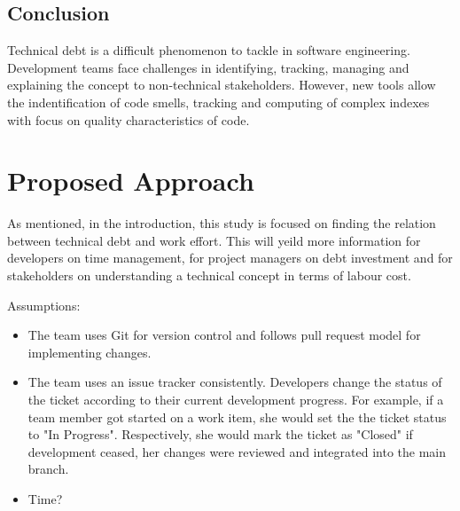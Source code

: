 \documentclass{mprop}
\begin{document}
\subsection{Conclusion}

Technical debt is a difficult phenomenon to tackle in software engineering.
Development teams face challenges in identifying, tracking, managing and
explaining the concept to non-technical stakeholders. However, new tools allow
the indentification of code smells, tracking and computing of complex indexes
with focus on quality characteristics of code.

\section{Proposed Approach}

As mentioned, in the introduction, this study is focused on finding the relation
between technical debt and work effort. This will yeild more information for
developers on time management, for project managers on debt investment and for
stakeholders on understanding a technical concept in terms of labour cost.

Assumptions:
\begin{itemize}
	\item The team uses Git for version control and follows pull request model
	for implementing changes.
	\item The team uses an issue tracker consistently. Developers change the
	status of the ticket according to their current development progress. For
	example, if a team member got started on a work item, she would set the the
	ticket status to "In Progress". Respectively, she would mark the ticket as
	"Closed" if development ceased, her changes were reviewed and integrated
	into the main branch.
	\item Time?   
\end{itemize}
\end{document}
